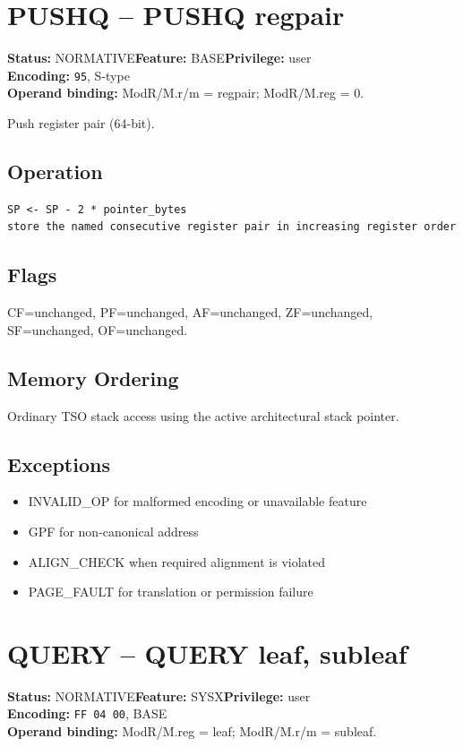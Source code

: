 \documentclass[10pt]{article}
\begin{document}
\section{PUSHQ -- PUSHQ regpair}
\textbf{Status:} NORMATIVE\quad \textbf{Feature:} BASE\quad \textbf{Privilege:} user\\
\textbf{Encoding:} \texttt{95}, S-type\\
\textbf{Operand binding:} ModR/M.r/m = regpair; ModR/M.reg = 0.

Push register pair (64-bit).

\subsection*{Operation}
\begin{lstlisting}
SP <- SP - 2 * pointer_bytes
store the named consecutive register pair in increasing register order
\end{lstlisting}
\subsection*{Flags}
CF=unchanged, PF=unchanged, AF=unchanged, ZF=unchanged, SF=unchanged, OF=unchanged.
\subsection*{Memory Ordering}
Ordinary TSO stack access using the active architectural stack pointer.
\subsection*{Exceptions}
\begin{itemize}
\item INVALID\_OP for malformed encoding or unavailable feature
\item GPF for non-canonical address
\item ALIGN\_CHECK when required alignment is violated
\item PAGE\_FAULT for translation or permission failure
\end{itemize}
\clearpage

\section{QUERY -- QUERY leaf, subleaf}
\textbf{Status:} NORMATIVE\quad \textbf{Feature:} SYSX\quad \textbf{Privilege:} user\\
\textbf{Encoding:} \texttt{FF 04 00}, BASE\\
\textbf{Operand binding:} ModR/M.reg = leaf; ModR/M.r/m = subleaf.
\end{document}
